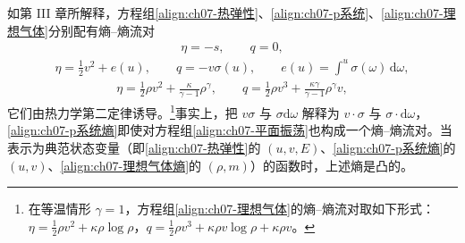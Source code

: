 \documentclass[../../main.tex]{subfiles}
\begin{document}
如第 III 章所解释，方程组\eqref{align:ch07-热弹性}、\eqref{align:ch07-p系统}、\eqref{align:ch07-理想气体}分别配有熵--熵流对
\begin{align}
\eta=-s,\qquad q=0,
\label{align:ch07-热弹性熵}
\end{align}
\begin{align}
\eta=\tfrac12 v^2+e(u),\qquad q=-v\sigma(u),\qquad e(u)=\int^u\sigma(\omega)\,\mathrm{d}\omega,
\label{align:ch07-p系统熵}
\end{align}
\begin{align}
\eta=\frac{1}{2}\rho v^2+\frac{\kappa}{\gamma-1}\rho^\gamma,\qquad
q=\frac{1}{2}\rho v^3+\frac{\kappa\gamma}{\gamma-1}\rho^\gamma v,
\label{align:ch07-理想气体熵}
\end{align}
它们由热力学第二定律诱导。\footnote{在等温情形 $\gamma=1$，方程组\eqref{align:ch07-理想气体}的熵--熵流对取如下形式：$\eta=\frac12\rho v^2+\kappa\rho\log\rho$，$q=\frac12\rho v^3+\kappa\rho v\log\rho+\kappa\rho v$。}事实上，把 $v\sigma$ 与 $\sigma\mathrm{d}\omega$ 解释为 $v\cdot\sigma$ 与 $\sigma\cdot\mathrm{d}\omega$，\eqref{align:ch07-p系统熵}即使对方程组\eqref{align:ch07-平面振荡}也构成一个熵--熵流对。当表示为典范状态变量（即\eqref{align:ch07-热弹性}的 $(u,v,E)$、\eqref{align:ch07-p系统熵}的 $(u,v)$、\eqref{align:ch07-理想气体熵}的 $(\rho,m)$）的函数时，上述熵是凸的。
\end{document}
